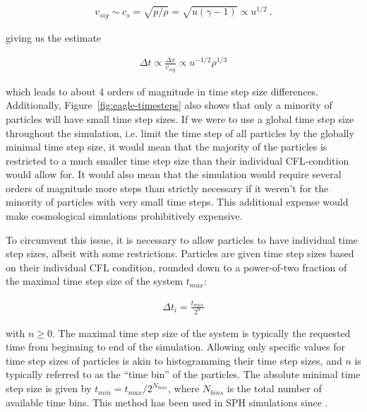 \begin{align}
v_{sig} \sim c_{s} = \sqrt{p/\rho} = \sqrt{u (\gamma - 1)} \propto  u^{1/2} \ .
\end{align}


giving us the estimate

\begin{align}
\Delta t \propto \frac{\Delta x}{v_{sig}} \propto u^{-1/2} \rho^{1/3}
\end{align}

which leads to about 4 orders of magnitude in time step size differences. Additionally,
Figure~\ref{fig:eagle-timesteps} also shows that only a minority of particles will have small time
step sizes. If we were to use a global time step size throughout the simulation, i.e. limit the
time step of all particles by the globally minimal time step size, it would mean that the majority
of the particles is restricted to a much smaller time step size than their individual CFL-condition
would allow for. It would also mean that the simulation would require several orders of magnitude
more steps than strictly necessary if it weren't for the minority of particles with very small time
steps. This additional expense would make cosmological simulations prohibitively expensive.

To circumvent this issue, it is necessary to allow particles to have individual time step sizes,
albeit with some restrictions. Particles are given time step sizes based on their individual CFL
condition, rounded down to a power-of-two fraction of the maximal time step size of the system
$t_{max}$:

\begin{align}
    \Delta t_i = \frac{t_{max}}{2^n}
\end{align}

with $n \geq 0$. The maximal time step size of the system is typically the requested time from
beginning to end of the simulation. Allowing only specific values for time step sizes of particles
is akin to histogramming their time step sizes, and $n$ is typically referred to as the ``time
bin'' of the particles. The absolute minimal time step size is given by $t_{min} = t_{max} /
2^{N_{bins}}$, where $N_{bins}$ is the total number of available time bins. This method has been
used in SPH simulations since \citet{hernquistTREESPHUnificationSPH1989}.

